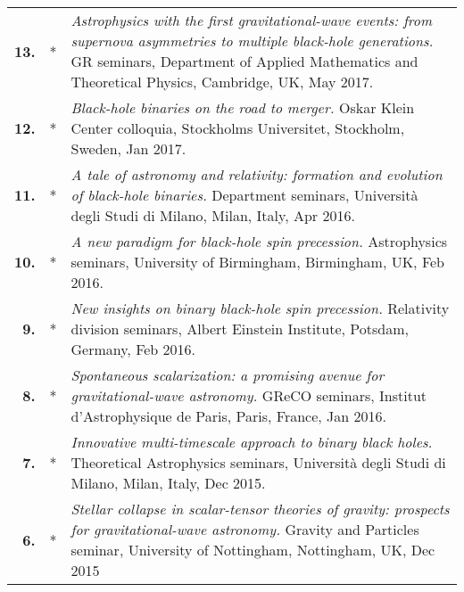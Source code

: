 \documentclass[11pt,letterpaper,sans]{moderncv}   %
\begin{document}
{\begin{longtable}{rp{0.4cm}p{15.8cm}}
%
\textbf{13.} & *& \textit{Astrophysics with the first gravitational-wave events: from supernova asymmetries to multiple black-hole generations.}
\newline{} 
GR seminars, Department of Applied Mathematics and Theoretical Physics, Cambridge, UK, May 2017.
\vspace{0.05cm}\\
%
\textbf{12.} & *& \textit{Black-hole binaries on the road to merger.}
\newline{} 
Oskar Klein Center colloquia, Stockholms Universitet, Stockholm, Sweden, Jan 2017.
\vspace{0.05cm}\\
%
\textbf{11.} & *& \textit{A tale of astronomy and relativity: formation and evolution of black-hole binaries.}
\newline{} 
Department seminars, Università degli Studi di Milano, Milan, Italy, Apr 2016.
\vspace{0.05cm}\\
%
\textbf{10.} & *& \textit{A new paradigm for black-hole spin precession.}
\newline{} 
Astrophysics seminars, University of Birmingham, Birmingham, UK, Feb 2016.
\vspace{0.05cm}\\
%
\textbf{9.} & *& \textit{New insights on binary black-hole spin precession.}
\newline{} 
Relativity division seminars, Albert Einstein Institute, Potsdam, Germany, Feb 2016.
\vspace{0.05cm}\\
%
\textbf{8.} & *& \textit{Spontaneous scalarization: a promising avenue for gravitational-wave astronomy.}
\newline{} 
GReCO seminars, Institut d'Astrophysique de Paris, Paris, France, Jan 2016.
\vspace{0.05cm}\\
%
\textbf{7.} & *& \textit{Innovative multi-timescale approach to binary black holes.}
\newline{} 
Theoretical Astrophysics seminars, Università degli Studi di Milano, Milan, Italy, Dec 2015.
\vspace{0.05cm}\\
%
\textbf{6.} & *& \textit{Stellar collapse in scalar-tensor theories of gravity: prospects for gravitational-wave astronomy.}
\newline{} 
Gravity and Particles seminar, University of Nottingham, Nottingham, UK, Dec 2015
\vspace{0.05cm}\\

\end{longtable}}
\end{document}
